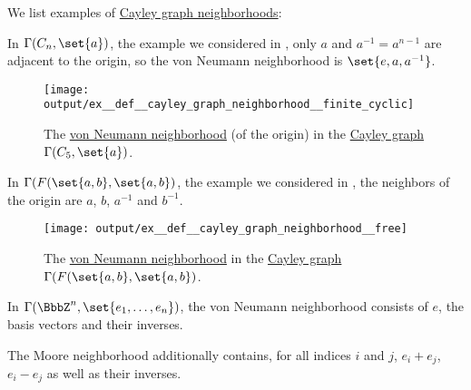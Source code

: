 \begin{example}\label{ex:def:cayley_graph_neighborhood}
  We list examples of \hyperref[def:cayley_graph_neighborhood]{Cayley graph neighborhoods}:
  \begin{thmenum}
     In \( \Gamma(C_n, \set{ a }) \), the example we considered in , only \( a \) and \( a^{-1} = a^{n-1} \) are adjacent to the origin, so the von Neumann neighborhood is \( \set{ e, a, a^{-1} } \).

    \begin{figure}[!ht]
      \centering
      \texttt{[image: output/ex\_\_def\_\_cayley\_graph\_neighborhood\_\_finite\_cyclic]}
      \caption{The \hyperref[def:cayley_graph_neighborhood/von_neumann]{von Neumann neighborhood} (of the origin) in the \hyperref[def:cayley_graph]{Cayley graph} \( \Gamma(C_5, \set{ a }) \).}\label{fig:ex:def:cayley_graph_neighborhood/finite_cyclic}
    \end{figure}

     In \( \Gamma(F(\set{ a, b }, \set{ a, b }) \), the example we considered in , the neighbors of the origin are \( a \), \( b \), \( a^{-1} \) and \( b^{-1} \).

    \begin{figure}[!ht]
      \centering
      \texttt{[image: output/ex\_\_def\_\_cayley\_graph\_neighborhood\_\_free]}
      \caption{The \hyperref[def:cayley_graph_neighborhood/von_neumann]{von Neumann neighborhood} in the \hyperref[def:cayley_graph]{Cayley graph} \( \Gamma(F(\set{ a, b }, \set{ a, b }) \).}\label{fig:ex:def:cayley_graph_neighborhood/free}
    \end{figure}

     In \( \Gamma(\BbbZ^n, \set{ e_1, \ldots, e_n }) \), the von Neumann neighborhood consists of \( e \), the basis vectors and their inverses.

    The Moore neighborhood additionally contains, for all indices \( i \) and \( j \), \( e_i + e_j \), \( e_i - e_j \) as well as their inverses.


\end{thmenum}
\end{example}

